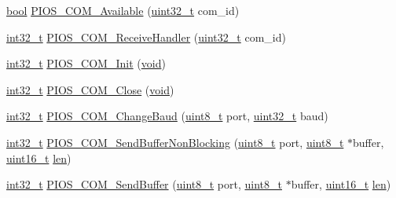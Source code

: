 \begin{DoxyCompactItemize}
\item 
\hyperlink{group___exported__types_gaf6a258d8f3ee5206d682d799316314b1}{bool} \hyperlink{group___p_i_o_s___c_o_m_gab614e9d0aa15baabc11392fc187d29ac}{P\-I\-O\-S\-\_\-\-C\-O\-M\-\_\-\-Available} (\hyperlink{stdint_8h_a435d1572bf3f880d55459d9805097f62}{uint32\-\_\-t} com\-\_\-id)
\item 
\hyperlink{group___n_a_m_e_gafd12020da5a235dfcf0c3c748fb5baed}{int32\-\_\-t} \hyperlink{group___p_i_o_s___c_o_m_ga3b2328b9c947b6939122d3549644d872}{P\-I\-O\-S\-\_\-\-C\-O\-M\-\_\-\-Receive\-Handler} (\hyperlink{stdint_8h_a435d1572bf3f880d55459d9805097f62}{uint32\-\_\-t} com\-\_\-id)
\item 
\hyperlink{group___n_a_m_e_gafd12020da5a235dfcf0c3c748fb5baed}{int32\-\_\-t} \hyperlink{group___p_i_o_s___c_o_m_ga15fe61943266ef53f2001cdb65bfe0c2}{P\-I\-O\-S\-\_\-\-C\-O\-M\-\_\-\-Init} (\hyperlink{group___n_a_m_e_ga18028b8badbf1ea7e704ccac3c488e82}{void})
\item 
\hyperlink{group___n_a_m_e_gafd12020da5a235dfcf0c3c748fb5baed}{int32\-\_\-t} \hyperlink{group___p_i_o_s___c_o_m_ga687820c733395eef98508017c0c303e9}{P\-I\-O\-S\-\_\-\-C\-O\-M\-\_\-\-Close} (\hyperlink{group___n_a_m_e_ga18028b8badbf1ea7e704ccac3c488e82}{void})
\item 
\hyperlink{group___n_a_m_e_gafd12020da5a235dfcf0c3c748fb5baed}{int32\-\_\-t} \hyperlink{group___p_i_o_s___c_o_m_ga57af61f12691d9ac9252282664f15508}{P\-I\-O\-S\-\_\-\-C\-O\-M\-\_\-\-Change\-Baud} (\hyperlink{stdint_8h_aba7bc1797add20fe3efdf37ced1182c5}{uint8\-\_\-t} port, \hyperlink{stdint_8h_a435d1572bf3f880d55459d9805097f62}{uint32\-\_\-t} baud)
\item 
\hyperlink{group___n_a_m_e_gafd12020da5a235dfcf0c3c748fb5baed}{int32\-\_\-t} \hyperlink{group___p_i_o_s___c_o_m_gab70f74c310c3ceb3fdb33ffb39bc3dc4}{P\-I\-O\-S\-\_\-\-C\-O\-M\-\_\-\-Send\-Buffer\-Non\-Blocking} (\hyperlink{stdint_8h_aba7bc1797add20fe3efdf37ced1182c5}{uint8\-\_\-t} port, \hyperlink{stdint_8h_aba7bc1797add20fe3efdf37ced1182c5}{uint8\-\_\-t} $\ast$buffer, \hyperlink{stdint_8h_a273cf69d639a59973b6019625df33e30}{uint16\-\_\-t} \hyperlink{mavlink__helpers_8h_aba59486c1504340293255a065b546e3a}{len})
\item 
\hyperlink{group___n_a_m_e_gafd12020da5a235dfcf0c3c748fb5baed}{int32\-\_\-t} \hyperlink{group___p_i_o_s___c_o_m_ga1c6734fb4297e5bd4172da32ac8ab3a0}{P\-I\-O\-S\-\_\-\-C\-O\-M\-\_\-\-Send\-Buffer} (\hyperlink{stdint_8h_aba7bc1797add20fe3efdf37ced1182c5}{uint8\-\_\-t} port, \hyperlink{stdint_8h_aba7bc1797add20fe3efdf37ced1182c5}{uint8\-\_\-t} $\ast$buffer, \hyperlink{stdint_8h_a273cf69d639a59973b6019625df33e30}{uint16\-\_\-t} \hyperlink{mavlink__helpers_8h_aba59486c1504340293255a065b546e3a}{len})

\end{DoxyCompactItemize}
